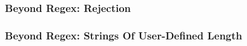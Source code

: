 \begin{frame}

\frametitle{Beyond Regex: Rejection}



\end{frame}


\begin{frame}

\frametitle{Beyond Regex: Strings Of User-Defined Length}



\end{frame}
